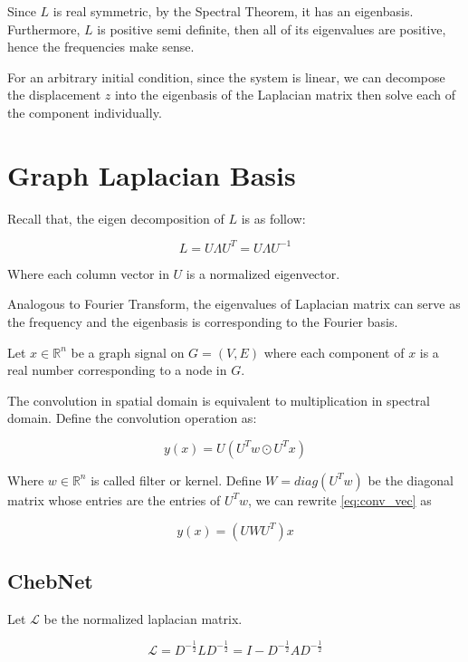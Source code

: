\documentclass{article}
\begin{document}
Since $L$ is real symmetric, by the Spectral Theorem, it has an eigenbasis. Furthermore, $L$ is positive semi definite, then all of its eigenvalues are positive, hence the frequencies make sense.

For an arbitrary initial condition, since the system is linear, we can decompose the displacement $z$ into the eigenbasis of the Laplacian matrix then solve each of the component individually.

\section{Graph Laplacian Basis}

Recall that, the eigen decomposition of $L$ is as follow:

\begin{equation}
    L = U \Lambda U^T = U \Lambda U^{-1}
\end{equation}

Where each column vector in $U$ is a normalized eigenvector.

Analogous to Fourier Transform, the eigenvalues of Laplacian matrix can serve as the frequency and the eigenbasis is corresponding to the Fourier basis.

Let $x \in \mathbb{R}^n$ be a graph signal on $G = (V, E)$ where each component of $x$ is a real number corresponding to a node in $G$.

The convolution in spatial domain is equivalent to multiplication in spectral domain. Define the convolution operation as:

\begin{equation}
    y(x) =  U ( U^T w \odot U^T x )
    \label{eq:conv_vec}
\end{equation}

Where $w \in \mathbb{R}^n$ is called filter or kernel. Define $W = diag(U^T w)$ be the diagonal matrix whose entries are the entries of $U^T w$, we can rewrite \ref{eq:conv_vec} as

\begin{equation}
    y(x) =  (U W U^T) x
\end{equation}

\subsection{ChebNet}


Let $\mathcal{L}$ be the normalized laplacian matrix.

\begin{equation}
    \mathcal{L} = D^{-\frac{1}{2}} L D^{-\frac{1}{2}} = I - D^{-\frac{1}{2}} A D^{-\frac{1}{2}}
\end{equation}
\end{document}
